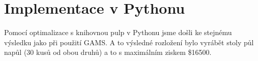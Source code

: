 \documentclass[../sablona-main.tex]{subfiles}
\begin{document}
\section{Implementace v Pythonu}
Pomocí optimalizace s knihovnou pulp v Pythonu jsme došli ke stejnému výsledku jako při použití GAMS. A to výsledné rozložení bylo vyrábět stoly půl napůl (30 kusů od obou druhů) a to s maximálním ziskem \$16500.
\end{document}
